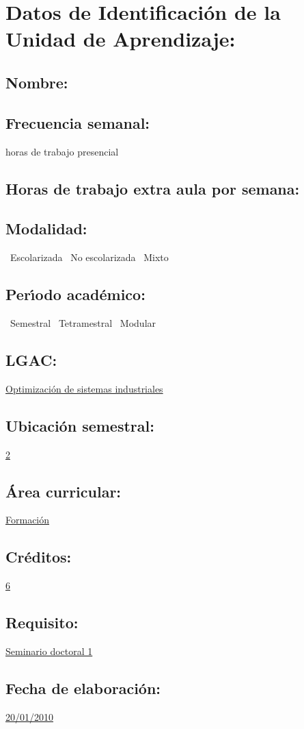 \documentclass[10 pt]{article}
\begin{document}


\section{Datos de Identificaci\'{o}n de la Unidad de Aprendizaje:}
\subsection{Nombre:} 
\subsection{Frecuencia semanal:} horas de trabajo presencial 
\subsection{Horas de trabajo extra aula por semana:} 
\subsection{Modalidad:} \yes~Escolarizada \no~No escolarizada \no~Mixto
\subsection{Per\'{\i}odo acad\'{e}mico:} \yes~Semestral
\no~Tetramestral \no~Modular
\subsection{LGAC:} \underline{Optimizaci\'{o}n de sistemas industriales}
\subsection{Ubicaci\'{o}n semestral:} \underline{2}
\subsection{\'{A}rea curricular:} \underline{Formaci\'{o}n}
\subsection{Cr\'{e}ditos:} \underline{6}
\subsection{Requisito:} \underline{Seminario doctoral 1}
\subsection{Fecha de elaboraci\'{o}n:} \underline{20/01/2010}
\end{document}
